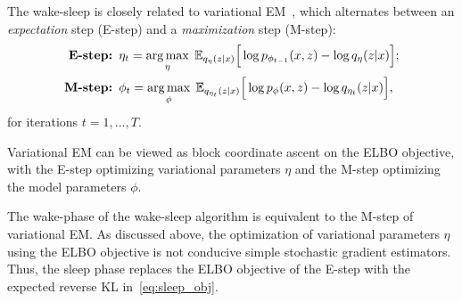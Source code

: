 The wake-sleep is closely related to variational EM~\cite{Jordan_intro_vi, neal2000varem, Beal2002varem}, 
which alternates between an {\itshape expectation} step (E-step) and a {\itshape maximization} step (M-step): 
\begin{align}
    \text{{\bf E-step: }} & 
    \eta_{t} = \operatorname*{arg\,max}_{\eta}\; \mathbb{E}_{q_\eta(z | x)}\Big[\log p_{\phi_{t-1}}(x, z) - \log q_\eta(z | x)\Big]; 
    \label{eq:e_step}
    \\
    \text{{\bf M-step: }} & \phi_{t} = \operatorname*{arg\,max}_{\phi}\; \mathbb{E}_{q_{\eta_t}(z | x)}\Big[\log p_{\phi}(x, z) - \log q_{\eta_t}(z | x)\Big],
    \label{eq:m_step}
\end{align}
for iterations $t = 1, ..., T$. 

Variational EM can be viewed as block coordinate ascent on the ELBO objective, with the E-step optimizing variational parameters $\eta$ and the M-step optimizing the model parameters $\phi$. 

The wake-phase of the wake-sleep algorithm is equivalent to the M-step of variational EM. 
As discussed above, the optimization of variational parameters $\eta$ using the ELBO objective is not conducive simple stochastic gradient estimators.
Thus, the sleep phase replaces the ELBO objective of the E-step with the expected reverse KL in~\eqref{eq:sleep_obj}.